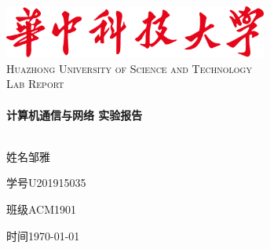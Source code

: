 \begin{titlepage}

\begin{center}


\includegraphics[width=0.65\textwidth]{figure/logo}\\[1cm]    

\textsc{\LARGE Huazhong University of Science and Technology}\\[1.5cm]

\textsc{\Large Lab Report}\\[0.5cm]


\HRule \\[0.4cm]
{ \huge \bfseries 计算机通信与网络 实验报告}\\[0.4cm]

\HRule \\[1.5cm]


\begin{minipage}{0.4\textwidth}
\large
{\heiti 姓名}\quad 邹雅

{\heiti 学号}\quad U201915035

{\heiti 班级}\quad ACM1901

{\heiti 时间}\quad \today
\end{minipage}

\vfill

\end{center}

\end{titlepage}
